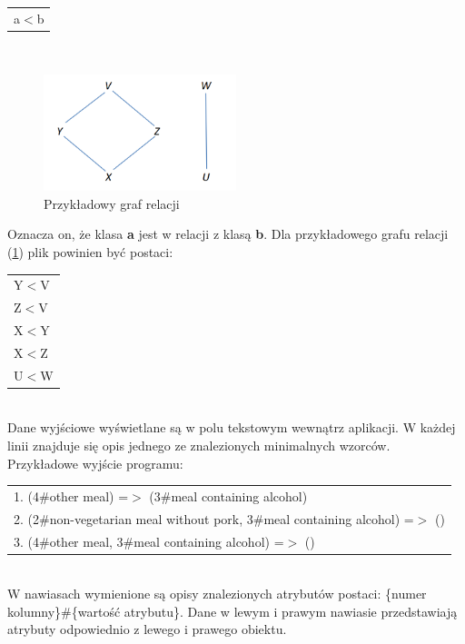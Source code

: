\documentclass[a4paper,12pt]{article}
\begin{document}
\begin{tabular}{l}
a$<$b \\
\end{tabular} \\

\begin{figure}[h!]
\begin{center}
\includegraphics[width=0.5\textwidth]{img/relations.png}
\caption{Przykładowy graf relacji}
\label{relat2}
\end{center}
\end{figure}

Oznacza on, że klasa {\bf a} jest w relacji z klasą {\bf b}.
Dla przykładowego grafu relacji (\ref{relat2}) plik powinien być postaci: \\

\begin{tabular}{l}
Y$<$V \\
Z$<$V \\
X$<$Y \\
X$<$Z \\
U$<$W \\
\end{tabular}
\\

Dane wyjściowe wyświetlane są w polu tekstowym wewnątrz aplikacji. W każdej linii znajduje się opis jednego ze znalezionych minimalnych wzorców. Przykładowe wyjście programu: \\

\begin{tabular}{l}
1. (4\#other meal) =$>$ (3\#meal containing alcohol) \\
2. (2\#non-vegetarian meal without pork, 3\#meal containing alcohol) =$>$ () \\
3. (4\#other meal, 3\#meal containing alcohol) =$>$ () \\
\end{tabular}
\\

W nawiasach wymienione są opisy znalezionych atrybutów postaci: \{numer kolumny\}\#\{wartość atrybutu\}. Dane w lewym i prawym nawiasie przedstawiają atrybuty odpowiednio z lewego i prawego obiektu. 
\end{document}
